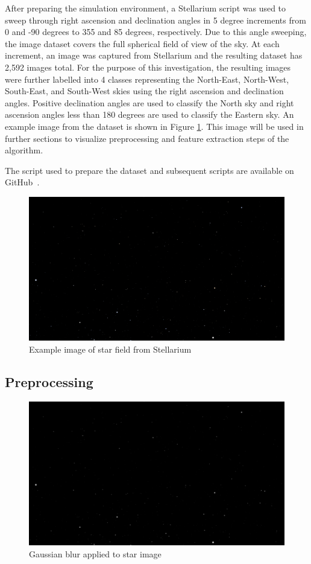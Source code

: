 \documentclass[10pt,twocolumn,letterpaper]{article}
\begin{document}
After preparing the simulation environment, a Stellarium script was used to sweep through right ascension and declination angles in 5 degree increments from 0 and -90 degrees to 355 and 85 degrees, respectively. Due to this angle sweeping, the image dataset covers the full spherical field of view of the sky. At each increment, an image was captured from Stellarium and the resulting dataset has 2,592 images total. For the purpose of this investigation, the resulting images were further labelled into 4 classes representing the North-East, North-West, South-East, and South-West skies using the right ascension and declination angles. Positive declination angles are used to classify the North sky and right ascension angles less than 180 degrees are used to classify the Eastern sky. An example image from the dataset is shown in Figure \ref{fig:star_img}. This image will be used in further sections to visualize preprocessing and feature extraction steps of the algorithm.

The script used to prepare the dataset and subsequent scripts are available on GitHub~\cite{git}.

\begin{figure}[H]
  \centering
   \includegraphics[width=0.9\linewidth]{stars_000}
   \caption{Example image of star field from Stellarium}
   \label{fig:star_img}
\end{figure}

\subsection{Preprocessing}

\begin{figure}[H]
  \centering
   \includegraphics[width=0.9\linewidth]{gauss}
   \caption{Gaussian blur applied to star image}
   \label{fig:star_gauss}
\end{figure}
\end{document}
